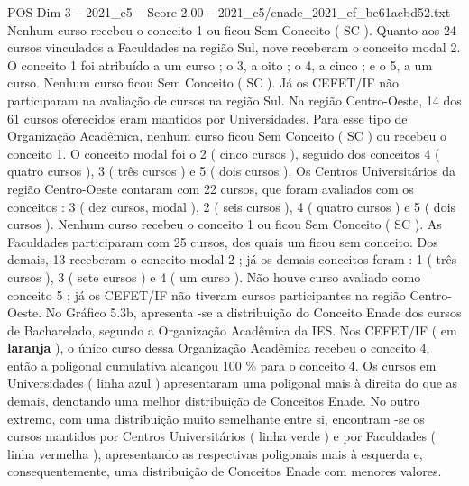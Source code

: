 \begin{textsample}{POS Dim 3 – 2021\_c5 – Score 2.00 – 2021\_c5/enade\_2021\_ef\_be61acbd52.txt}
Nenhum curso recebeu o conceito 1 ou ficou Sem Conceito ( SC ).
Quanto aos 24 cursos vinculados a Faculdades na região Sul, nove receberam o conceito modal 2.
O conceito 1 foi atribuído a um curso ; o 3, a oito ; o 4, a cinco ; e o 5, a um curso.
Nenhum curso ficou Sem Conceito ( SC ).
Já os CEFET/IF não participaram na avaliação de cursos na região Sul.
Na região Centro-Oeste, 14 dos 61 cursos oferecidos eram mantidos por Universidades.
Para esse tipo de Organização Acadêmica, nenhum curso ficou Sem Conceito ( SC ) ou recebeu o conceito 1.
O conceito modal foi o 2 ( cinco cursos ), seguido dos conceitos 4 ( quatro cursos ), 3 ( três cursos ) e 5 ( dois cursos ).
Os Centros Universitários da região Centro-Oeste contaram com 22 cursos, que foram avaliados com os conceitos : 3 ( dez cursos, modal ), 2 ( seis cursos ), 4 ( quatro cursos ) e 5 ( dois cursos ).
Nenhum curso recebeu o conceito 1 ou ficou Sem Conceito ( SC ).
As Faculdades participaram com 25 cursos, dos quais um ficou sem conceito.
Dos demais, 13 receberam o conceito modal 2 ; já os demais conceitos foram : 1 ( três cursos ), 3 ( sete cursos ) e 4 ( um curso ).
Não houve curso avaliado como conceito 5 ; já os CEFET/IF não tiveram cursos participantes na região Centro-Oeste.
No Gráfico 5.3b, apresenta -se a distribuição do Conceito Enade dos cursos de Bacharelado, segundo a Organização Acadêmica da IES.
Nos CEFET/IF ( em \textbf{laranja} ), o único curso dessa Organização Acadêmica recebeu o conceito 4, então a poligonal cumulativa alcançou 100 \% para o conceito 4.
Os cursos em Universidades ( linha azul ) apresentaram uma poligonal mais à direita do que as demais, denotando uma melhor distribuição de Conceitos Enade.
No outro extremo, com uma distribuição muito semelhante entre si, encontram -se os cursos mantidos por Centros Universitários ( linha verde ) e por Faculdades ( linha vermelha ), apresentando as respectivas poligonais mais à esquerda e, consequentemente, uma distribuição de Conceitos Enade com menores valores.

\end{textsample}

